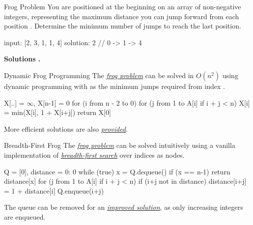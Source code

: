 \documentclass{cognito}
\begin{document}
\begin{note}{Frog Problem} 
	You are positioned at the beginning on an array  of non-negative integers,
	representing the maximum distance  you can jump forward from each position .
	Determine the minimum number of jumps to reach the last position.
	
	\begin{largecode}
 input: [2, 3, 1, 1, 4]
 solution: 2  // 0 -> 1 -> 4
	\end{largecode}
	\bf Solutions \hyperref[note:Dynamic Frog Programming]{\solutionref}
		\hyperref[note:Breadth-First Frog]{\solutionref}
		\hyperref[note:Improved Breadth-First Frog]{\solutionref}
		\hyperref[note:Linear Frog Solution]{\solutionref}.
\end{note} 

\begin{note}{Dynamic Frog Programming}
	The \hyperref[note:Frog Problem]{\it frog problem} can be solved in $O(n^2)$ using dynamic programming
	with  as the minimum jumps required from index .

	\begin{largecode}
 X[..] = $\infty$, X[n-1] = 0
 for (i from n - 2 to 0)
 	for (j from 1 to A[i] if i + j < n)
		X[i] = min(X[i], 1 + X[i+j])
 return X[0]
	\end{largecode}	%
	\begin{remark} More efficient solutions are also \hyperref[note:Frog Problem]{\it provided}. \end{remark}
	\vspace{-5pt}
\end{note}

\begin{note}{Breadth-First Frog}
	The \hyperref[note:Frog Problem]{\it frog problem} can be solved intuitively using a vanilla implementation of
	\hyperref[note:Breadth-First Search]{\it breadth-first search} over indices as nodes.
	\begin{largecode}
 Q = [0], distance = {0: 0}
 while (true)
 	x = Q.dequeue()
	if (x == n-1) return distance[x]
	for (j from 1 to A[i] if i + j < n)
		if (i+j not in distance)
			distance[i+j] = 1 + distance[i]
			Q.enqueue(i+j)
	\end{largecode}
	\begin{remark}
		The queue  can be removed for an \hyperref[note:Improved Breadth-First Frog]{\it improved solution},
		as only increasing integers are enqueued.
	\end{remark}
	\vspace{-5pt}
\end{note}
\end{document}
